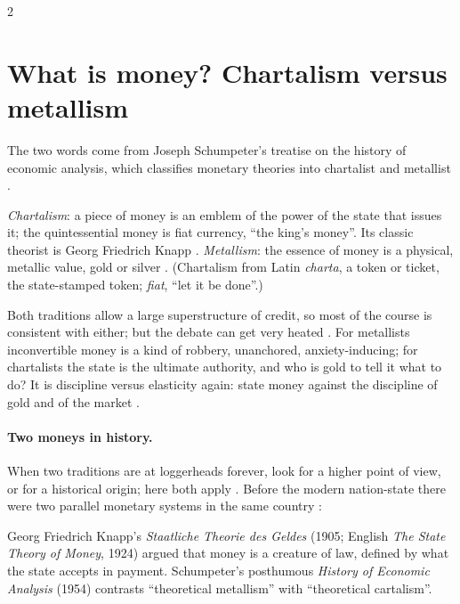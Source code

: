 \begin{paracol}{2}
\section{What is money? Chartalism versus metallism}\label{sec:cm-what}

The two words come from Joseph Schumpeter's treatise on the history of economic analysis, which classifies monetary theories into chartalist and metallist
.

\begin{definition}\label{def:cm-chartalism}
\emph{Chartalism}: a piece of money is an emblem of the power of the state that issues it; the quintessential money is fiat currency, ``the king's money''. Its
classic theorist is Georg Friedrich Knapp . \emph{Metallism}: the essence of money is a physical, metallic value,
gold or silver . (Chartalism from Latin \emph{charta}, a token or ticket, the state-stamped token; \emph{fiat}, ``let it be done''.)
\end{definition}

Both traditions allow a large superstructure of credit, so most of the course is consistent with either; but the debate can get very heated
. For metallists inconvertible money is a kind of robbery, unanchored, anxiety-inducing; for chartalists the state is the ultimate
authority, and who is gold to tell it what to do? It is discipline versus elasticity again: state money against the discipline of gold and of the market
.

\clearpage\paragraph{Two moneys in history.} When two traditions are at loggerheads forever, look for a higher point of view, or for a historical origin; here both apply
. Before the modern nation-state there were two parallel monetary systems in the same country :
\begin{history}
Georg Friedrich Knapp's \emph{Staatliche Theorie des Geldes} (1905; English \emph{The State Theory of Money}, 1924) argued that money is a creature of law,
defined by what the state accepts in payment. Schumpeter's posthumous \emph{History of Economic Analysis} (1954) contrasts ``theoretical metallism'' with
``theoretical cartalism''.


\end{history}
\end{paracol}
